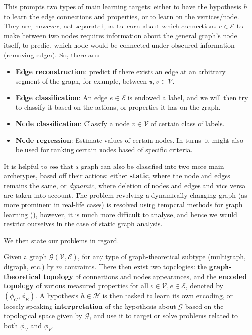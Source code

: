 This prompts two types of main learning targets: either to have the hypothesis $h$ to learn the edge connections and properties, or to learn on the vertices/node. They are, however, not separated, as to learn about which connections $e\in \mathcal{E}$ to make between two nodes requires information about the general graph's node itself, to predict which node would be connected under obscured information (removing edges). So, there are: 
\begin{itemize}[topsep=0pt,noitemsep]
    \item \textbf{Edge reconstruction}: predict if there exists an edge at an arbitrary segment of the graph, for example, between $u,v\in \mathcal{V}$. 
    \item \textbf{Edge classification}: An edge $e\in \mathcal{E}$ is endowed a label, and we will then try to classify it based on the actions, or properties it has on the graph. 
    \item \textbf{Node classification}: Classify a node $v\in \mathcal{V}$ of certain class of labels. 
    \item \textbf{Node regression}: Estimate values of certain nodes. In turns, it might also be used for ranking certain nodes based of specific criteria. 
\end{itemize}
It is helpful to see that a graph can also be classified into two more main archetypes, based off their actions: either \textbf{static}, where the node and edges remains the same, or \textit{dynamic}, where deletion of nodes and edges and vice versa are taken into account. The problem revolving a dynamically changing graph (as more prominent in real-life cases) is resolved using temporal methods for graph learning (\cite{rossi2020temporalgraphnetworksdeep}), however, it is much more difficult to analyse, and hence we would restrict ourselves in the case of static graph analysis. 

We then state our problems in regard. 

\begin{definition}
    Given a graph $\mathcal{G}(\mathcal{V},\mathcal{E})$, for any type of graph-theoretical subtype (multigraph, digraph, etc.) by $m$ contraints. There then exist two topologies: the \textbf{graph-theoretical topology} of connections and nodes appearances, and the \textbf{encoded topology} of various measured properties for all $v\in \mathcal{V}, e\in \mathcal{E}$, denoted by $(\phi_{G},\phi_{E})$. A hypothesis $h\in \mathcal{H}$ is then tasked to learn its own encoding, or loosely speaking \textbf{interpretation} of the hypothesis about $\mathcal{G}$ based on the topological space given by $\mathcal{G}$, and use it to target or solve problems related to both $\phi_{G}$ and $\phi_{E}$. 
\end{definition}

